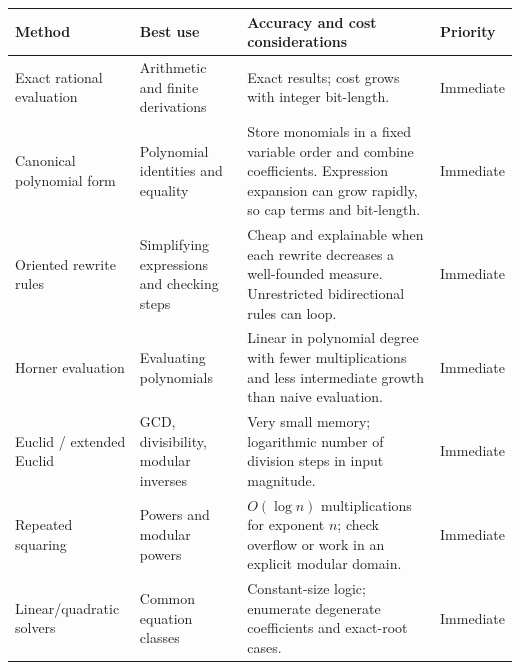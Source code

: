 \documentclass[
  10pt,
]{article}
\newcounter{none} %
\begin{document}
{\def\LTcaptype{none} %
\begin{longtable}[]{@{}
  >{\raggedright\arraybackslash}p{}
  >{\raggedright\arraybackslash}p{}
  >{\raggedright\arraybackslash}p{}
  >{\raggedright\arraybackslash}p{}@{}}
\toprule\noalign{}
\begin{minipage}[b]{\linewidth}\raggedright
Method
\end{minipage} & \begin{minipage}[b]{\linewidth}\raggedright
Best use
\end{minipage} & \begin{minipage}[b]{\linewidth}\raggedright
Accuracy and cost considerations
\end{minipage} & \begin{minipage}[b]{\linewidth}\raggedright
Priority
\end{minipage} \\
\midrule\noalign{}
\endhead
\bottomrule\noalign{}
\endlastfoot
Exact rational evaluation & Arithmetic and finite derivations & Exact
results; cost grows with integer bit-length. & Immediate \\
Canonical polynomial form & Polynomial identities and equality & Store
monomials in a fixed variable order and combine coefficients. Expression
expansion can grow rapidly, so cap terms and bit-length. & Immediate \\
Oriented rewrite rules & Simplifying expressions and checking steps &
Cheap and explainable when each rewrite decreases a well-founded
measure. Unrestricted bidirectional rules can loop. & Immediate \\
Horner evaluation & Evaluating polynomials & Linear in polynomial degree
with fewer multiplications and less intermediate growth than naive
evaluation. & Immediate \\
Euclid / extended Euclid & GCD, divisibility, modular inverses & Very
small memory; logarithmic number of division steps in input magnitude. &
Immediate \\
Repeated squaring & Powers and modular powers & \(O(\log n)\)
multiplications for exponent \(n\); check overflow or work in an
explicit modular domain. & Immediate \\
Linear/quadratic solvers & Common equation classes & Constant-size
logic; enumerate degenerate coefficients and exact-root cases. &
Immediate \\

\end{longtable}}
\end{document}
